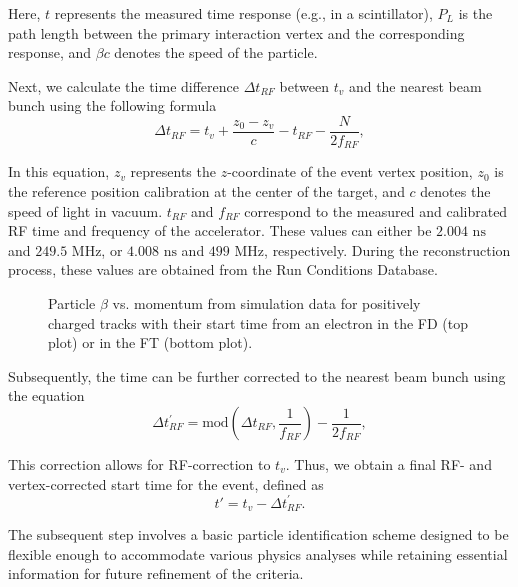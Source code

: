     Here, $t$ represents the measured time response (e.g., in a scintillator), $P_L$ is the path length between the primary interaction vertex and the corresponding response, and $\beta c$ denotes the speed of the particle.

    Next, we calculate the time difference $\Delta t_{RF}$ between $t_v$ and the nearest beam bunch using the following formula
    \begin{equation*}
        \Delta t_{RF} = t_v + \frac{z_0 - z_v}{c} - t_{RF} - \frac{N}{2f_{RF}},
    \end{equation*}

    In this equation, $z_v$ represents the $z$-coordinate of the event vertex position, $z_0$ is the reference position calibration at the center of the target, and $c$ denotes the speed of light in vacuum.
    $t_{RF}$ and $f_{RF}$ correspond to the measured and calibrated RF time and frequency of the accelerator.
    These values can either be $2.004 \text{ ns}$ and $249.5 \text{ MHz}$, or $4.008 \text{ ns}$ and $499 \text{ MHz}$, respectively.
    During the reconstruction process, these values are obtained from the Run Conditions Database.

    \begin{wrapfigure}{r}{0.49\textwidth}
        \caption[Particle $\beta$ vs. momentum for positively charged tracks.]
        {Particle $\beta$ vs. momentum from simulation data for positively charged tracks with their start time from an electron in the FD (top plot) or in the FT (bottom plot).}
        \label{fig::11.232::positive_pid}
    \end{wrapfigure}

    Subsequently, the time can be further corrected to the nearest beam bunch using the equation
    \begin{equation*}
        \Delta t^\prime_{RF} = \text{mod}\left(\Delta t_{RF}, \frac{1}{f_{RF}}\right) - \frac{1}{2f_{RF}},
    \end{equation*}

    This correction allows for RF-correction to $t_v$. Thus, we obtain a final RF- and vertex-corrected start time for the event, defined as
    \begin{equation*}
        t' = t_v - \Delta t^\prime_{RF}.
    \end{equation*}

    The subsequent step involves a basic particle identification scheme designed to be flexible enough to accommodate various physics analyses while retaining essential information for future refinement of the criteria.

